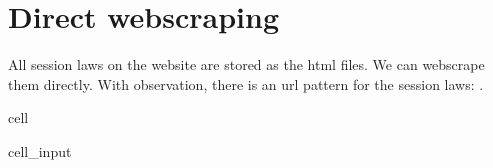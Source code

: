 \documentclass[letterpaper,10pt,english]{jupyterBook}
\begin{document}
\section{Direct webscraping}
\label{\detokenize{ch42:direct-webscraping}}
\sphinxAtStartPar
All session laws on the website are stored as the html files. We can webscrape them directly. With observation, there is an url pattern for the session laws: .

\begin{sphinxuseclass}{cell}\begin{sphinxVerbatimInput}

\begin{sphinxuseclass}{cell_input}
\begin{sphinxVerbatim}[commandchars=\\\{\}]
  \PYG{p}{[}\PYG{p}{]}
  \PYG{p}{[}\PYG{p}{]}
  \PYG{p}{[}\PYG{p}{]}
  \PYG{p}{[}\PYG{p}{]}


\end{sphinxVerbatim}
\end{sphinxuseclass}
\end{sphinxVerbatimInput}
\end{sphinxuseclass}
\end{document}
